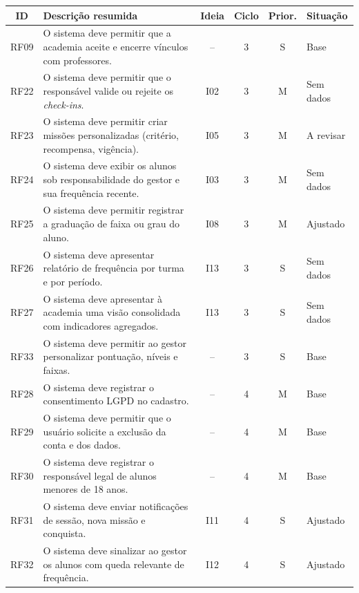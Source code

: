 \begin{quadro}[!htb]
  \caption{Requisitos funcionais dos Ciclos 3 e 4}
  \label{qua:rf2}
  \centering
  \footnotesize
  \begin{tabular}{|c|p{7.3cm}|c|c|c|p{1.6cm}|}
    \hline
    \textbf{ID} & \textbf{Descrição resumida} & \textbf{Ideia} & \textbf{Ciclo} & \textbf{Prior.} & \textbf{Situação} \\ \hline
    RF09 & O sistema deve permitir que a academia aceite e encerre vínculos com professores. & -- & 3 & S & Base \\ \hline
    RF22 & O sistema deve permitir que o responsável valide ou rejeite os \textit{check-ins}. & I02 & 3 & M & Sem dados \\ \hline
    RF23 & O sistema deve permitir criar missões personalizadas (critério, recompensa, vigência). & I05 & 3 & M & A revisar \\ \hline
    RF24 & O sistema deve exibir os alunos sob responsabilidade do gestor e sua frequência recente. & I03 & 3 & M & Sem dados \\ \hline
    RF25 & O sistema deve permitir registrar a graduação de faixa ou grau do aluno. & I08 & 3 & M & Ajustado \\ \hline
    RF26 & O sistema deve apresentar relatório de frequência por turma e por período. & I13 & 3 & S & Sem dados \\ \hline
    RF27 & O sistema deve apresentar à academia uma visão consolidada com indicadores agregados. & I13 & 3 & S & Sem dados \\ \hline
    RF33 & O sistema deve permitir ao gestor personalizar pontuação, níveis e faixas. & -- & 3 & S & Base \\ \hline
    RF28 & O sistema deve registrar o consentimento LGPD no cadastro. & -- & 4 & M & Base \\ \hline
    RF29 & O sistema deve permitir que o usuário solicite a exclusão da conta e dos dados. & -- & 4 & M & Base \\ \hline
    RF30 & O sistema deve registrar o responsável legal de alunos menores de 18 anos. & -- & 4 & M & Base \\ \hline
    RF31 & O sistema deve enviar notificações de sessão, nova missão e conquista. & I11 & 4 & S & Ajustado \\ \hline
    RF32 & O sistema deve sinalizar ao gestor os alunos com queda relevante de frequência. & I12 & 4 & S & Ajustado \\ \hline
  \end{tabular}
\end{quadro}

